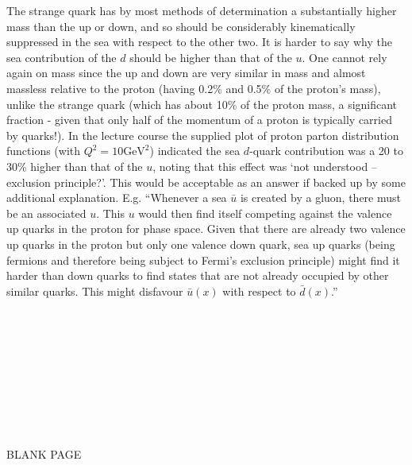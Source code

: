 \documentclass[txfonts]{NSTexam}
\begin{document}
\begin{questions}
\begin{parts}
The strange quark has by most methods of determination a substantially higher mass than the up or down, and so should be considerably kinematically suppressed in the sea with respect to the other two.  It is harder to say why the sea contribution of the $d$ should be higher than that of the $u$.  One cannot rely again on mass since the up and down are very similar in mass and almost massless relative to the proton (having 0.2\% and 0.5\% of the proton's mass), unlike the strange quark
(which has about 10\% of the proton mass, a significant fraction - given that only half of the momentum of a proton is typically carried by quarks!). In the lecture course
the supplied plot of proton parton distribution functions (with $Q^2= 10 \text{GeV}^2$) indicated the sea $d$-quark contribution was a 20 to 30\% higher than that
of the $u$, noting that this effect was `not understood -- exclusion principle?'.  This would be acceptable as an answer if backed up by some additional explanation.  E.g. ``Whenever a sea $\bar u$ is created by a gluon, there must be an associated $u$. This $u$ would then find itself competing against the valence up quarks in the proton for phase space.  Given that there are already two valence up quarks in the proton but only one valence down quark, sea up quarks (being fermions
and therefore being subject to
 Fermi's exclusion principle) might find it harder than down quarks to 
 find states that are not already occupied by other similar quarks.  This might disfavour $\bar u(x)$ with respect to $\bar d(x)$.''
\endanswer
\end{parts}
\enlargethispage{2\baselineskip}




\end{questions}
\newpage
$${}^{}$$

$${}^{}$$

$${}^{}$$

$${}^{}$$

$${}^{}$$

$${}^{}$$

$${}^{}$$

$${}^{}$$

$${}^{}$$


\begin{center}
    BLANK PAGE
\end{center}
\end{document}
